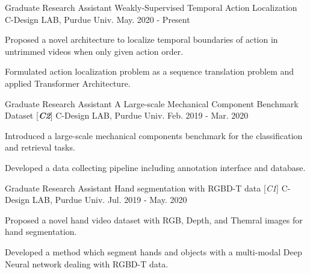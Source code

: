 

\begin{cventries}

\cventry
{Graduate Research Assistant} %
{Weakly-Supervised Temporal Action Localization} %
{C-Design LAB, Purdue Univ.} %
{May. 2020 - Present} %
{ %
\begin{cvitems}
\item {Proposed a novel architecture to localize temporal boundaries of action in untrimmed videos when only given action order.}
\item {Formulated action localization problem as a sequence translation problem and applied Transformer Architecture.}
\end{cvitems}
}

\cventry
{Graduate Research Assistant} %
{A Large-scale Mechanical Component Benchmark Dataset [\textit{\textbf{C2}}]} %
{C-Design LAB, Purdue Univ.} %
{Feb. 2019 - Mar. 2020} %
{ %
\begin{cvitems}
\item {Introduced a large-scale mechanical components benchmark for the classification and retrieval tasks.}
\item {Developed a data collecting pipeline including annotation interface and database.}
\end{cvitems}
}

\cventry
{Graduate Research Assistant} %
{Hand segmentation with RGBD-T data [\textit{\textit{C1}}]} %
{C-Design LAB, Purdue Univ.} %
{Jul. 2019 - May. 2020} %
{ %
\begin{cvitems}
\item {Proposed a novel hand video dataset with RGB, Depth, and Themral images for hand segmentation.}
\item {Developed a method which segment hands and objects with a multi-modal Deep Neural network dealing with RGBD-T data.}
\end{cvitems}
}


\end{cventries}
